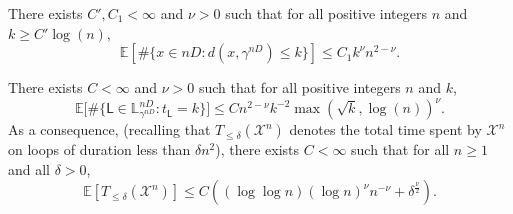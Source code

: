 \documentclass[10pt,a4paper]{amsart}
\begin{document}
\begin{corollary}
    \label{coro:vol}
    There exists $C',C_1<\infty$ and $\nu>0$ such that for all positive integers $n$ and $k\geq C' \log(n)$,
    \[
\mathbb{E}[\#\{ x\in n D: d(x,\gamma^{nD})\leq k  \}] \leq C_1  k^\nu n^{2-\nu}.
    \]
\end{corollary}

\begin{proposition}
    \label{prop:vol2}
    There exists $C<\infty$ and $\nu>0$ such that for all positive integers $n$ and $k$,
    \[
    \mathbb{E}\Big[ \#   \{   \mathsf{L}\in \mathbb{L}^{nD}_{\gamma^{nD}}: t_\mathsf{L}=k \}  \Big]
    \leq C n^{2-\nu}   k^{-2}
    \max(\sqrt{k},   \log(n))^\nu .
    \]
    As a consequence, (recalling that $T_{\leq \delta} (\mathcal{X}^n)$ denotes the total time spent by $\mathcal{X}^n$ on loops of duration less than $\delta n^2$), there exists $C<\infty$ such that for all $n\geq 1$ and all $\delta>0$,
    \begin{equation}
    \label{eq:temp:Ebound}
    \mathbb{E}[T_{\leq \delta}(\mathcal{X}^n)]
    \leq C ((\log\log n) (\log n)^\nu n^{-\nu}+ \delta^{\frac{\nu}{2}}).
    \end{equation}
\end{proposition}
\end{document}
